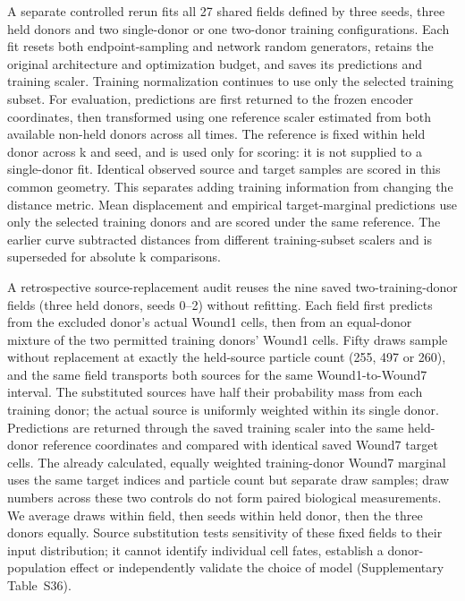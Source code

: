 \documentclass[10pt,a4paper]{article}
\begin{document}
A separate controlled rerun fits all 27 shared fields defined by three seeds, three held donors and two single-donor or one two-donor training configurations. Each fit resets both endpoint-sampling and network random generators, retains the original architecture and optimization budget, and saves its predictions and training scaler. Training normalization continues to use only the selected training subset. For evaluation, predictions are first returned to the frozen encoder coordinates, then transformed using one reference scaler estimated from both available non-held donors across all times. The reference is fixed within held donor across k and seed, and is used only for scoring: it is not supplied to a single-donor fit. Identical observed source and target samples are scored in this common geometry. This separates adding training information from changing the distance metric. Mean displacement and empirical target-marginal predictions use only the selected training donors and are scored under the same reference. The earlier curve subtracted distances from different training-subset scalers and is superseded for absolute k comparisons.

A retrospective source-replacement audit reuses the nine saved two-training-donor fields (three held donors, seeds 0--2) without refitting. Each field first predicts from the excluded donor's actual Wound1 cells, then from an equal-donor mixture of the two permitted training donors' Wound1 cells. Fifty draws sample without replacement at exactly the held-source particle count (255, 497 or 260), and the same field transports both sources for the same Wound1-to-Wound7 interval. The substituted sources have half their probability mass from each training donor; the actual source is uniformly weighted within its single donor. Predictions are returned through the saved training scaler into the same held-donor reference coordinates and compared with identical saved Wound7 target cells. The already calculated, equally weighted training-donor Wound7 marginal uses the same target indices and particle count but separate draw samples; draw numbers across these two controls do not form paired biological measurements. We average draws within field, then seeds within held donor, then the three donors equally. Source substitution tests sensitivity of these fixed fields to their input distribution; it cannot identify individual cell fates, establish a donor-population effect or independently validate the choice of model (Supplementary Table~S36).
\end{document}
